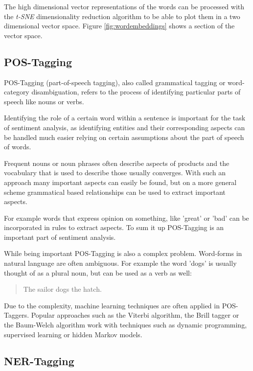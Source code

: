 \documentclass[10pt,a4paper]{article}
\begin{document}
		The high dimensional vector representations of the words can be processed with the \textit{t-SNE} dimensionality reduction algorithm to be able to plot them in a two dimensional vector space. Figure \ref{fig:wordembeddings} shows a section of the vector space.
		
		\subsection{POS-Tagging}

		POS-Tagging (part-of-speech tagging), also called grammatical tagging or word-category disambiguation, refers to the process of identifying particular parts of speech like nouns or verbs. 

		Identifying the role of a certain word within a sentence is important for the task of sentiment analysis, as identifying entities and their corresponding aspects can be handled much easier relying on certain assumptions about the part of speech of words.

		Frequent nouns or noun phrases often describe aspects of products and the vocabulary that is used to describe those usually converges. With such an approach many important aspects can easily be found, but on a more general scheme grammatical based relationships can be used to extract important aspects.

		For example words that express opinion on something, like 'great' or 'bad' can be incorporated in rules to extract aspects. To sum it up POS-Tagging is an important part of sentiment analysis.
		
		While being important POS-Tagging is also a complex problem. Word-forms in natural language are often ambiguous. For example the word 'dogs' is usually thought of as a plural noun, but can be used as a verb as well:

		\begin{quote}
			The sailor dogs the hatch.
		\end{quote}

		Due to the complexity, machine learning techniques are often applied in POS-Taggers. Popular approaches such as the Viterbi algorithm, the Brill tagger or the Baum-Welch algorithm work with techniques such as dynamic programming, supervised learning or hidden Markov models.
		
		\subsection{NER-Tagging}
		
\end{document}
